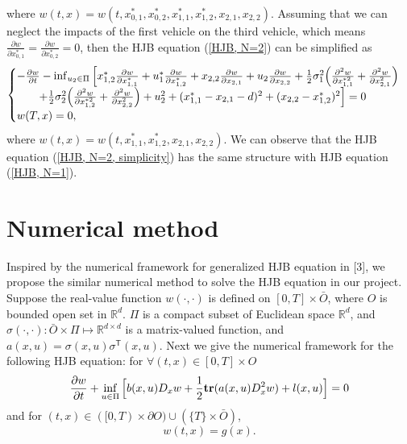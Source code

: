 \documentclass{article}
\begin{document}
where $w(t, x) = w(t, x_{0, 1}^{*}, x_{0, 2}^{*}, x_{1, 1}^{*}, x_{1, 2}^{*}, x_{2,1}, x_{2,2})$. Assuming that we can neglect the impacts of the first vehicle on the third vehicle, which means $\frac{\partial w}{\partial x_{0, 1}^{*}} = \frac{\partial w}{\partial x_{0, 2}^{*}} = 0$, then the HJB equation (\ref{HJB, N=2}) can be simplified as
\begin{equation} \label{HJB, N=2, simplicity}
    \begin{cases}
   - \frac{\partial w}{\partial t} - \inf_{u_{2} \in \Pi} \Big{[} x_{1,2}^{*} \frac{\partial w}{\partial x_{1, 1}^{*}} + u_{1}^{*} \frac{\partial w}{\partial x_{1, 2}^{*}} + x_{2,2} \frac{\partial w}{\partial x_{2, 1}} + u_{2} \frac{\partial w}{\partial x_{2, 2}} + \frac{1}{2} \sigma_{1}^{2} \Big{(} \frac{\partial^{2} w}{\partial x_{1, 1}^{* 2}} + \frac{\partial^{2} w}{\partial x_{2, 1}^{2}} \Big{)} \\
   \qquad  + \frac{1}{2} \sigma_{2}^{2} \Big{(} \frac{\partial^{2} w}{\partial x_{1, 2}^{* 2}} + \frac{\partial^{2} w}{\partial x_{2, 2}^{2}} \Big{)} + u_{2}^{2} + (x_{1, 1}^{*} - x_{2, 1} - d)^{2} + (x_{2, 2} - x_{1, 2}^{*})^{2}  \Big{]}   = 0  \\
   w(T, x) = 0,
   \end{cases}
\end{equation}
where $w(t, x) = w(t, x_{1, 1}^{*}, x_{1, 2}^{*}, x_{2,1}, x_{2,2})$. We can observe that the HJB equation (\ref{HJB, N=2, simplicity}) has the same structure with HJB equation (\ref{HJB, N=1}).


\section{Numerical method}

Inspired by the numerical framework for generalized HJB equation in [3], we propose the similar numerical method to solve the HJB equation in our project. Suppose the real-value function $w(\cdot, \cdot)$ is defined on $[0, T] \times \bar{O}$, where $O$ is bounded open set in $\mathbb{R}^{d}$. $\Pi$ is a compact subset of Euclidean space $\mathbb{R}^{d}$, and $\sigma(\cdot, \cdot): \bar{O} \times \Pi \mapsto \mathbb{R}^{d \times d}$ is a matrix-valued function, and $a(x, u) = \sigma(x, u) \sigma^\mathsf{T} (x, u)$. Next we give the numerical framework for the following HJB equation: for $\forall (t, x) \in [0, T] \times O$
\begin{equation} \label{HJB, numerical}
    \frac{\partial w}{\partial t} + \inf_{u \in \Pi} \Big{[} b(x, u) D_{x} w + \frac{1}{2} \textbf{tr} (a(x, u) D_{x}^{2} w) + l(x, u) \Big{]} = 0
\end{equation}
and for $(t, x) \in ([0, T) \times \partial O) \cup (\{T\} \times \bar{O})$,
\begin{equation*}
    w(t, x) = g(x).
\end{equation*}
\end{document}
